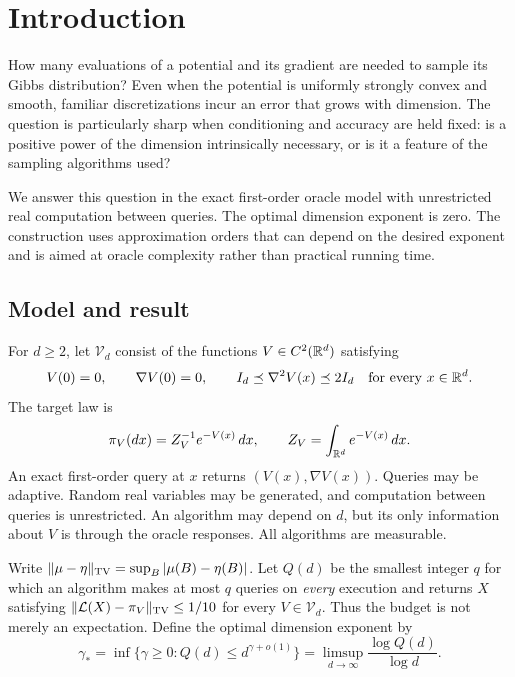 \section{Introduction}\label{sec:introduction}

How many evaluations of a potential and its gradient are needed
to sample its Gibbs distribution? Even when the potential is
uniformly strongly convex and smooth, familiar discretizations
incur an error that grows with dimension. The question is
particularly sharp when conditioning and accuracy are held fixed:
is a positive power of the dimension intrinsically necessary,
or is it a feature of the sampling algorithms used?

We answer this question in the exact first-order oracle model
with unrestricted real computation between queries. The optimal
dimension exponent is zero. The construction uses approximation
orders that can depend on the desired exponent and is aimed at
oracle complexity rather than practical running time.

\subsection{Model and result}

For \(d\ge2\), let \(\mathcal V_d\) consist of the functions
\(V\in C^2(\mathbb R^d)\) satisfying
\begin{equation}\label{eq:original-class}
 V(0)=0,\qquad \nabla V(0)=0,\qquad
 I_d\preceq\nabla^2V(x)\preceq2I_d
                         \quad\text{for every }x\in\mathbb R^d.
\end{equation}
The target law is
\[
 \pi_V(dx)=Z_V^{-1}e^{-V(x)}\,dx,\qquad
 Z_V=\int_{\mathbb R^d}e^{-V(x)}\,dx.
\]
An exact first-order query at \(x\) returns
\((V(x),\nabla V(x))\). Queries may be adaptive.
Random real variables may be generated, and computation
between queries is unrestricted. An algorithm may depend
on \(d\), but its only information about \(V\) is through
the oracle responses. All algorithms are measurable.

Write \(\lVert\mu-\eta\rVert_{\mathrm{TV}}=\sup_B|\mu(B)-\eta(B)|\).
Let \(Q(d)\) be the smallest integer \(q\) for which
an algorithm makes at most \(q\) queries on \emph{every}
execution and returns \(X\) satisfying
\(\lVert\mathcal L(X)-\pi_V\rVert_{\mathrm{TV}}\le1/10\) for
every \(V\in\mathcal V_d\). Thus the budget is not
merely an expectation. Define the optimal dimension exponent
by
\[
 \gamma_*=\inf\{\gamma\ge0:Q(d)\le d^{\gamma+o(1)}\}
          =\limsup_{d\to\infty}\frac{\log Q(d)}{\log d}.
\]

